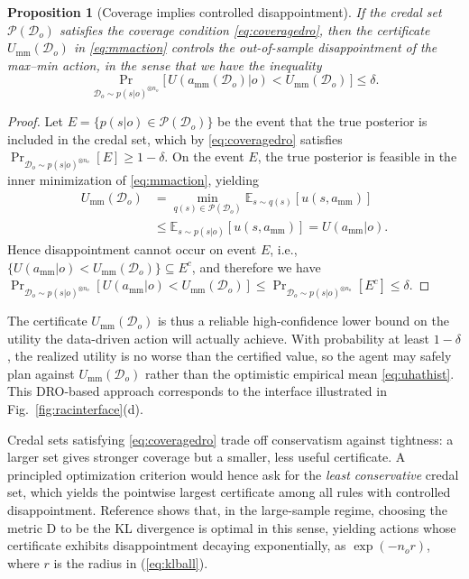 \documentclass[journal]{IEEEtran}
\newtheorem{proposition}{Proposition}
\theoremstyle{definition}
\theoremstyle{remark}
\newcommand{\E}{\mathbb{E}}
\newcommand{\Dset}{\mathcal{D}}
\newcommand{\Pset}{\mathcal{P}}
\begin{document}
\begin{proposition}[Coverage implies controlled disappointment]
\label{prop:cov}
If the credal set $\Pset(\Dset_o)$ satisfies the coverage condition
\eqref{eq:coveragedro}, then the certificate $U_{\mathrm{mm}}(\Dset_o)$ in
\eqref{eq:mmaction} controls the out-of-sample disappointment of the max--min
action, in the sense that we have the inequality 
\begin{equation}
\label{eq:disappointmentbound}
\Pr_{\Dset_o\sim p(s| o)^{\otimes n_o}}\!\bigl[\,U(a_{\mathrm{mm}}(\Dset_o)| o) < U_{\mathrm{mm}}(\Dset_o) \,\bigr] \leq \delta.
\end{equation}
\end{proposition}
\begin{proof}
Let $E=\{p(s| o)\in\Pset(\Dset_o)\}$ be the event that the true posterior is included in the credal set, which by \eqref{eq:coveragedro}
satisfies $\Pr_{\Dset_o\sim p(s| o)^{\otimes n_o}}[E]\ge 1-\delta$. On the event $E$, the true posterior is feasible in the
inner minimization of \eqref{eq:mmaction}, yielding 
\begin{align}
U_{\mathrm{mm}}(\Dset_o) &=\min_{q(s)\in\Pset(\Dset_o)}\E_{s\sim q(s)}[u(s,a_{\mathrm{mm}})]
\nonumber \\&\le \E_{s\sim p(s|o)}[u(s,a_{\mathrm{mm}})]=U(a_{\mathrm{mm}}| o).
\end{align}
Hence disappointment cannot occur on event $E$, i.e., 
$\{U(a_{\mathrm{mm}}| o)<U_{\mathrm{mm}}(\Dset_o)\}\subseteq E^{c}$, and
therefore we have 
$\Pr_{\Dset_o\sim p(s| o)^{\otimes n_o}}[U(a_{\mathrm{mm}}| o)<U_{\mathrm{mm}}(\Dset_o)]\le\Pr_{\Dset_o\sim p(s| o)^{\otimes n_o}}[E^{c}]\le\delta$.
\end{proof}

The certificate $U_{\mathrm{mm}}(\Dset_o)$ is thus a reliable high-confidence
lower bound on the utility the data-driven action will actually achieve. With
probability at least $1-\delta$, the realized utility is no worse than the
certified value, so the agent may safely plan against $U_{\mathrm{mm}}(\Dset_o)$
rather than the optimistic empirical mean \eqref{eq:uhathist}. This DRO-based approach corresponds to 
the interface illustrated in  Fig.~\ref{fig:racinterface}(d).

Credal sets
satisfying \eqref{eq:coveragedro} trade off conservatism against tightness: a
larger set gives stronger coverage but a smaller, less useful certificate. A principled optimization criterion would hence ask  for the \emph{least conservative} credal set, which yields the pointwise largest
certificate among all rules with controlled disappointment. Reference \cite{vanparys2021optimal} shows that, in the
large-sample regime, choosing the metric $\mathrm D$ to be the KL divergence is optimal
in this sense, yielding actions whose certificate exhibits disappointment
decaying exponentially, as $\exp(-n_o r)$, where $r$ is the radius in (\ref{eq:klball}). 
\end{document}

